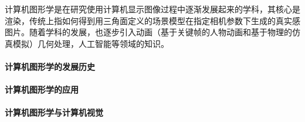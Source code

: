 计算机图形学是在研究使用计算机显示图像过程中逐渐发展起来的学科，其核心是渲染，传统上指如何得到用三角面定义的场景模型在指定相机参数下生成的真实感图片。随着学科的发展，也逐步引入动画（基于关键帧的人物动画和基于物理的仿真模拟）几何处理，人工智能等领域的知识。

\paragraph{计算机图形学的发展历史}

\paragraph{计算机图形学的应用}

\paragraph{计算机图形学与计算机视觉}




